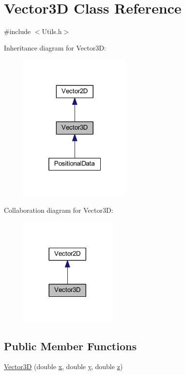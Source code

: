 \hypertarget{class_vector3_d}{}\section{Vector3D Class Reference}
\label{class_vector3_d}


{\ttfamily \#include $<$Utils.\+h$>$}



Inheritance diagram for Vector3D\+:\nopagebreak
\begin{figure}[H]
\begin{center}
\leavevmode
\includegraphics[width=160pt]{class_vector3_d__inherit__graph}
\end{center}
\end{figure}


Collaboration diagram for Vector3D\+:\nopagebreak
\begin{figure}[H]
\begin{center}
\leavevmode
\includegraphics[width=137pt]{class_vector3_d__coll__graph}
\end{center}
\end{figure}
\subsection*{Public Member Functions}
\begin{DoxyCompactItemize}
\item 
\hyperlink{class_vector3_d_abd851542da40b1168edcad11fa83b7c2}{Vector3D} (double \hyperlink{class_vector2_d_ac5c4e553815737aa24bec8281270178f}{x}, double \hyperlink{class_vector2_d_ac38d0179cfe74c30fee290a703ab209a}{y}, double \hyperlink{class_vector3_d_a7321f3ff785f275c4d83f7d1b951752a}{z})
\end{DoxyCompactItemize}
